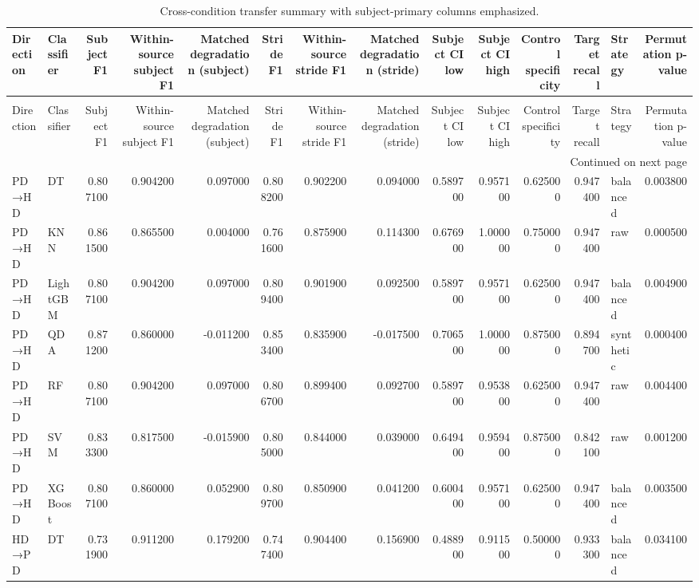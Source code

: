 \begin{longtable}{llrrrrrrrrrrlr}
\caption{Cross-condition transfer summary with subject-primary columns emphasized.} \label{tab:paper_main_results_summary_v4} \\
\toprule
Direction & Classifier & Subject F1 & Within-source subject F1 & Matched degradation (subject) & Stride F1 & Within-source stride F1 & Matched degradation (stride) & Subject CI low & Subject CI high & Control specificity & Target recall & Strategy & Permutation p-value \\
\midrule
\endfirsthead
\caption[]{Cross-condition transfer summary with subject-primary columns emphasized.} \\
\toprule
Direction & Classifier & Subject F1 & Within-source subject F1 & Matched degradation (subject) & Stride F1 & Within-source stride F1 & Matched degradation (stride) & Subject CI low & Subject CI high & Control specificity & Target recall & Strategy & Permutation p-value \\
\midrule
\endhead
\midrule
\multicolumn{14}{r}{Continued on next page} \\
\midrule
\endfoot
\bottomrule
\endlastfoot
PD→HD & DT & 0.807100 & 0.904200 & 0.097000 & 0.808200 & 0.902200 & 0.094000 & 0.589700 & 0.957100 & 0.625000 & 0.947400 & balanced & 0.003800 \\
PD→HD & KNN & 0.861500 & 0.865500 & 0.004000 & 0.761600 & 0.875900 & 0.114300 & 0.676900 & 1.000000 & 0.750000 & 0.947400 & raw & 0.000500 \\
PD→HD & LightGBM & 0.807100 & 0.904200 & 0.097000 & 0.809400 & 0.901900 & 0.092500 & 0.589700 & 0.957100 & 0.625000 & 0.947400 & balanced & 0.004900 \\
PD→HD & QDA & 0.871200 & 0.860000 & -0.011200 & 0.853400 & 0.835900 & -0.017500 & 0.706500 & 1.000000 & 0.875000 & 0.894700 & synthetic & 0.000400 \\
PD→HD & RF & 0.807100 & 0.904200 & 0.097000 & 0.806700 & 0.899400 & 0.092700 & 0.589700 & 0.953800 & 0.625000 & 0.947400 & raw & 0.004400 \\
PD→HD & SVM & 0.833300 & 0.817500 & -0.015900 & 0.805000 & 0.844000 & 0.039000 & 0.649400 & 0.959400 & 0.875000 & 0.842100 & raw & 0.001200 \\
PD→HD & XGBoost & 0.807100 & 0.860000 & 0.052900 & 0.809700 & 0.850900 & 0.041200 & 0.600400 & 0.957100 & 0.625000 & 0.947400 & balanced & 0.003500 \\
HD→PD & DT & 0.731900 & 0.911200 & 0.179200 & 0.747400 & 0.904400 & 0.156900 & 0.488900 & 0.911500 & 0.500000 & 0.933300 & balanced & 0.034100 \\

\end{longtable}
